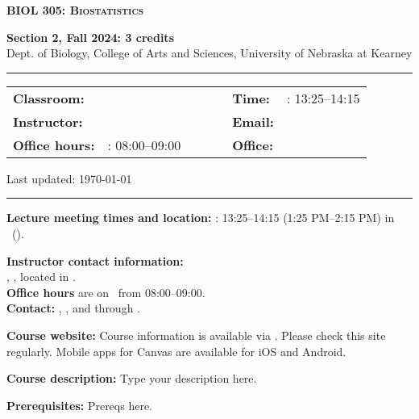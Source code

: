 \documentclass[11pt]{article}
\begin{document}
	\begin{center}
		{\Large \textsc{\textbf{BIOL 305: Biostatistics}}}
	\end{center}
	\begin{center}
		\textbf{Section 2, Fall 2024: 3 credits} \\
		Dept. of Biology, College of Arts and Sciences, University of Nebraska at Kearney
	\end{center}
	
	\begin{center}
		\rule{6in}{0.4pt}
		\begin{minipage}[t]{0.95\textwidth}
			\begin{tabular}{llcccll}
				\textbf{Classroom:} & \classroom & & & & \textbf{Time:} & \classdays: 13:25--14:15 \\
				\textbf{Instructor:} & \profname & & & & \textbf{Email:} & \email \\
				\textbf{Office hours:} & \classdays: 08:00--09:00 & & & & \textbf{Office:} & \office \\
			\end{tabular}
			\centering
			Last updated: \today
		\end{minipage}
		\rule{6in}{0.4pt}
	\end{center}
	\vspace{.3cm}
	\setlength{\unitlength}{1in}
	\renewcommand{\arraystretch}{2}
	
	\noindent\textbf{Lecture meeting times and location:} \longdays: 13:25--14:15 (1:25 PM--2:15 PM) in \classroom\ (\buildingname).
	
	\skippers
	\noindent\textbf{Instructor contact information:}\\
	\textbf{\profname}, \proftitle, located in \office.\\ \textbf{Office hours} are on \classdays\ from 08:00--09:00. \\
	\noindent\textbf{Contact:} \phone, \email, and through \canvas.
	
	\skippers
	\noindent\textbf{Course website:} Course information is available via 
	\canvas. Please check this site regularly. Mobile apps for Canvas are available for iOS and Android.
	
	\skippers
	\noindent\textbf{Course description:} Type your description here.
	
	\skippers
	\noindent\textbf{Prerequisites:} Prereqs here.
	 
\end{document}
